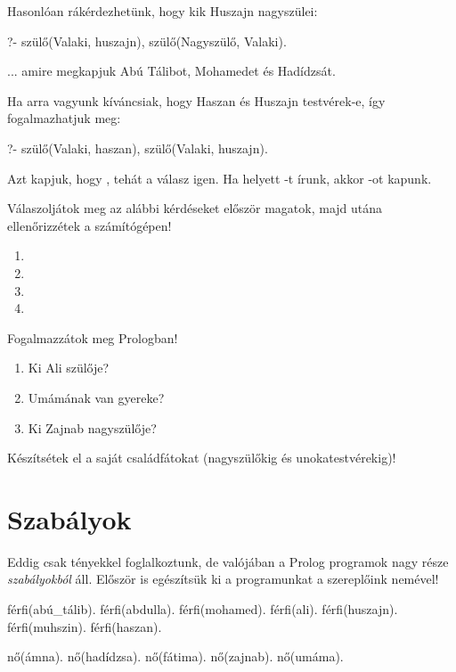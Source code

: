 Hasonlóan rákérdezhetünk, hogy kik Huszajn nagyszülei:
\begin{prolog}
?- szülő(Valaki, huszajn), szülő(Nagyszülő, Valaki).
\end{prolog}
... amire megkapjuk Abú Tálibot, Mohamedet és Hadídzsát.

Ha arra vagyunk kíváncsiak, hogy Haszan és Huszajn testvérek-e, így fogalmazhatjuk meg:
\begin{prolog}
?- szülő(Valaki, haszan), szülő(Valaki, huszajn).
\end{prolog}
Azt kapjuk, hogy , tehát a válasz igen. Ha  helyett -t írunk, akkor -ot kapunk.

\begin{problem}
Válaszoljátok meg az alábbi kérdéseket először magatok, majd utána ellenőrizzétek a számítógépen!
\begin{enumerate}
\item {}
\item {}
\item {}
\item {}
\end{enumerate}
\end{problem}
\begin{problem}
Fogalmazzátok meg Prologban!
\begin{enumerate}
\item Ki Ali szülője?
\item Umámának van gyereke?
\item Ki Zajnab nagyszülője?
\end{enumerate}
\end{problem}
\begin{problem}
Készítsétek el a saját családfátokat (nagyszülőkig
és unokatestvérekig)!
\end{problem}

\section{Szabályok}

Eddig csak tényekkel foglalkoztunk, de valójában a
Prolog programok nagy része \emph{szabályokból}
áll. Először is egészítsük ki a programunkat a
szereplőink nemével!

\begin{prolog}
férfi(abú_tálib).
férfi(abdulla).
férfi(mohamed).
férfi(ali).
férfi(huszajn).
férfi(muhszin).
férfi(haszan).

nő(ámna).
nő(hadídzsa).
nő(fátima).
nő(zajnab).
nő(umáma).
\end{prolog}

